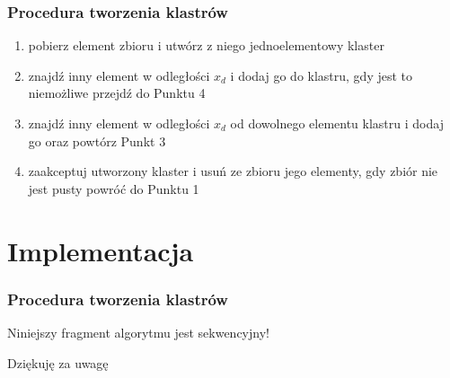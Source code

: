 \documentclass{beamer}
\begin{document}
\begin{frame}\frametitle{Procedura tworzenia klastrów}
\begin{enumerate}
\item pobierz element zbioru i utwórz z niego jednoelementowy klaster
\item znajdź inny element w odległości $x_d$ i dodaj go do klastru, gdy jest to niemożliwe przejdź do Punktu 4
\item znajdź inny element w odległości $x_d$ od dowolnego elementu klastru i dodaj go oraz powtórz Punkt 3
\item zaakceptuj utworzony klaster i usuń ze zbioru jego elementy, gdy zbiór nie jest pusty powróć do Punktu 1
\end{enumerate}
\end{frame}




\section{Implementacja}
\begin{frame}\frametitle{Procedura tworzenia klastrów}
\begin{center}
Niniejszy fragment algorytmu jest sekwencyjny!
\end{center}
\end{frame}




\begin{frame}
\begin{center}
\Huge Dziękuję za uwagę
\end{center}
\end{frame}



%
\end{document}

